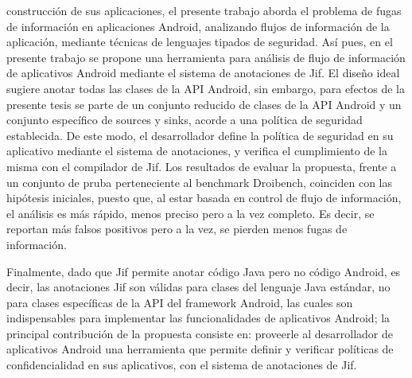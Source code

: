 construcción de sus aplicaciones, el presente trabajo aborda el problema de
fugas de información en aplicaciones Android, analizando flujos de información
de la aplicación, mediante técnicas de lenguajes tipados de seguridad.\newline
Así pues, en el presente trabajo se propone una herramienta para análisis de
flujo de información de aplicativos Android mediante el sistema de anotaciones
de Jif.\newline
El diseño ideal sugiere anotar todas las clases de la API Android,
sin embargo, para efectos de la presente tesis se parte de un conjunto
reducido de clases de la API Android y un conjunto específico de sources y
sinks, acorde a una política de seguridad establecida. 
De este modo, el desarrollador define la política de seguridad en su
aplicativo mediante el sistema de anotaciones, y verifica el cumplimiento de la
misma con el compilador de Jif.\newline  
Los resultados de evaluar la propuesta, frente a un conjunto de pruba
perteneciente al benchmark Droibench, coinciden con las hipótesis iniciales,
puesto que, al estar basada en control de flujo de información, el análisis es
más rápido, menos preciso pero a la vez completo. Es decir, se reportan más
falsos positivos pero a la vez, se pierden menos fugas de información.

Finalmente, dado que Jif permite
anotar código Java pero no código Android, es decir, las anotaciones Jif son
válidas para clases del lenguaje Java estándar, no para clases específicas de la
API del framework Android, las cuales son indispensables para
implementar las funcionalidades de aplicativos Android; la principal
contribución de la propuesta consiste en: proveerle al desarrollador de
aplicativos Android una herramienta que permite definir y verificar políticas de
confidencialidad en sus aplicativos, con el sistema de anotaciones de
Jif.\newline


